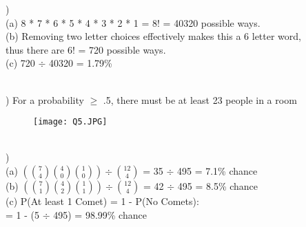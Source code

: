 \documentclass[12pt]{article}
\begin{document}
)\\
\indent (a) 8 * 7 * 6 * 5 * 4 * 3 * 2 * 1 = 8! = 40320 possible ways.\\

\indent (b) Removing two letter choices effectively makes this a 6 letter word, \\
\indent thus there are 6! = 720 possible ways.\\

\indent (c) 720 $\div$ 40320 = 1.79\% \\


\hrulefill \\
\pagebreak


) For a probability $\ge$ .5, there must be at least 23 people in a room 
\begin{figure}[h!]
  \centering
  \texttt{[image: Q5.JPG]}
\end{figure}




\hrulefill \\


)\\
\indent (a) {\Large $({7 \choose 4}{4 \choose 0}{1 \choose 0})\div{12 \choose 4}$} = 35 $\div$ 495 = 7.1\% chance\\

\indent (b) {\Large $({7 \choose 1}{4 \choose 2}{1 \choose 1})\div{12 \choose 4}$} = 42 $\div$ 495 = 8.5\% chance\\

\indent (c) P(At least 1 Comet) = 1 - P(No Comets):\\
\indent {} = 1 - (5 $\div$ 495) = 98.99\% chance\\
\end{document}
